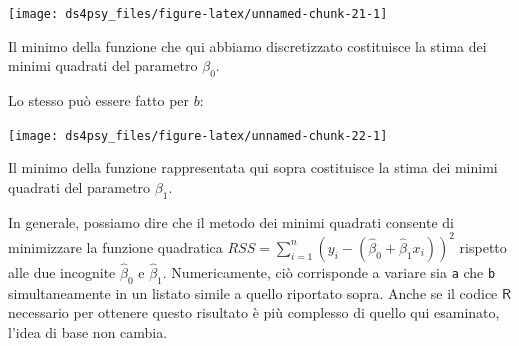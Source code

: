 \documentclass[
  11pt,
]{krantz}
\makeatletter
\newenvironment{Shaded}{\begin{snugshade}}{\end{snugshade}}
\newcommand{\AttributeTok}[1]{\textcolor[rgb]{0.61,0.61,0.61}{#1}}
\newcommand{\DecValTok}[1]{\textcolor[rgb]{0.06,0.06,0.06}{#1}}
\newcommand{\FloatTok}[1]{\textcolor[rgb]{0.06,0.06,0.06}{#1}}
\newcommand{\FunctionTok}[1]{\textcolor[rgb]{0,0,0}{#1}}
\newcommand{\NormalTok}[1]{#1}
\newcommand{\SpecialCharTok}[1]{\textcolor[rgb]{0,0,0}{#1}}
\newcommand{\StringTok}[1]{\textcolor[rgb]{0.5,0.5,0.5}{#1}}
\newenvironment{kframe}{%
\medskip{}
\setlength{\fboxsep}{.8em}
 \def\at@end@of@kframe{}%
 \ifinner\ifhmode%
  \def\at@end@of@kframe{\end{minipage}}%
  \begin{minipage}{\columnwidth}%
 \fi\fi%
 \def\FrameCommand##1{\hskip\@totalleftmargin \hskip-\fboxsep
 \colorbox{shadecolor}{##1}\hskip-\fboxsep
     \hskip-\linewidth \hskip-\@totalleftmargin \hskip\columnwidth}%
 \MakeFramed {\advance\hsize-\width
   \@totalleftmargin\z@ \linewidth\hsize
   \@setminipage}}%
 {\par\unskip\endMakeFramed%
 \at@end@of@kframe}
\renewenvironment{Shaded}{\begin{kframe}}{\end{kframe}}
\newcommand{\R}{\textsf{R}} %
\theoremstyle{definition}
\theoremstyle{definition}
\theoremstyle{definition}
\theoremstyle{definition}
\theoremstyle{remark}
\makeatother
\begin{document}
\begin{center}\texttt{[image: ds4psy\_files/figure-latex/unnamed-chunk-21-1]} \end{center}

Il minimo della funzione che qui abbiamo discretizzato costituisce la stima dei minimi quadrati del parametro \(\beta_0\).

Lo stesso può essere fatto per \(b\):

\begin{Shaded}
\end{Shaded}

\begin{center}\texttt{[image: ds4psy\_files/figure-latex/unnamed-chunk-22-1]} \end{center}

Il minimo della funzione rappresentata qui sopra costituisce la stima dei minimi quadrati del parametro \(\beta_1\).

In generale, possiamo dire che il metodo dei minimi quadrati consente di minimizzare la funzione quadratica \(RSS = \sum_{i=1}^n \left(y_i - (\hat{\beta}_0 + \hat{\beta}_1 x_i)\right)^2\) rispetto alle due incognite \(\hat{\beta}_0\) e \(\hat{\beta}_1\). Numericamente, ciò corrisponde a variare sia \texttt{a} che \texttt{b} simultaneamente in un listato simile a quello riportato sopra. Anche se il codice \(\R\) necessario per ottenere questo risultato è più complesso di quello qui esaminato, l'idea di base non cambia.
\end{document}
